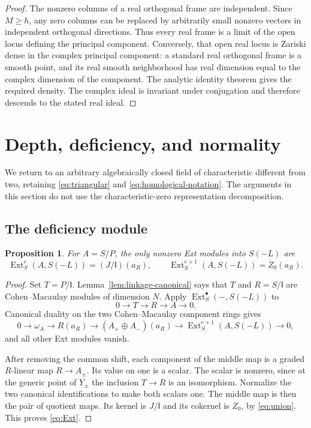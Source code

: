\documentclass[11pt]{article}
\newtheorem{proposition}[theorem]{Proposition}
\theoremstyle{definition}
\theoremstyle{remark}
\numberwithin{equation}{section}
\DeclareMathOperator{\Ext}{Ext}
\newcommand{\II}{\mathsf I}
\begin{document}
\begin{proof}
The nonzero columns of a real orthogonal frame are independent. Since
$M\geq h$, any zero columns can be replaced by arbitrarily small
nonzero vectors in independent orthogonal directions. Thus every real
frame is a limit of the open locus defining the principal component.
Conversely, that open real locus is Zariski dense in the complex
principal component: a standard real orthogonal frame is a smooth
point, and its real smooth neighborhood has real dimension equal to
the complex dimension of the component. The analytic identity theorem
gives the required density. The complex ideal is invariant under
conjugation and therefore descends to the stated real ideal.
\end{proof}

\section{Depth, deficiency, and normality}\label{sec:depth}

We return to an arbitrary algebraically closed field of characteristic
different from two, retaining \eqref{eq:triangular} and
\eqref{eq:homological-notation}. The arguments in this section do not
use the characteristic-zero representation decomposition.

\subsection{The deficiency module}

\begin{proposition}\label{prop:Ext}
For $A=S/P$, the only nonzero Ext modules into $S(-L)$ are
\begin{equation}\label{eq:Ext}
 \Ext^e_S(A,S(-L))=(J/\II)(a_R),\qquad
 \Ext^{e+1}_S(A,S(-L))=Z_0(a_R).
\end{equation}
\end{proposition}

\begin{proof}
Set $T=P/\II$. Lemma~\ref{lem:linkage-canonical} says that $T$ and
$R=S/\II$ are Cohen--Macaulay modules of dimension $N$. Apply
$\Ext_S^\bullet(-,S(-L))$ to
\[
 0\longrightarrow T\longrightarrow R\longrightarrow A\longrightarrow0.
\]
Canonical duality on the two Cohen--Macaulay component rings gives
\begin{equation}\label{eq:dual-sequence}
 0\longrightarrow\omega_A\longrightarrow R(a_R)
 \longrightarrow(A_+\oplus A_-)(a_R)
 \longrightarrow\Ext^{e+1}_S(A,S(-L))\longrightarrow0,
\end{equation}
and all other Ext modules vanish.

After removing the common shift, each component of the middle map
is a graded $R$-linear map $R\to A_\pm$. Its value on one is a
scalar. The scalar is nonzero, since at the generic point of $Y_\pm$
the inclusion $T\to R$ is an isomorphism. Normalize the two canonical
identifications to make both scalars one. The middle map is then the
pair of quotient maps. Its kernel is $J/\II$ and its cokernel is
$Z_0$, by \eqref{eq:union}. This proves \eqref{eq:Ext}.
\end{proof}
\end{document}
